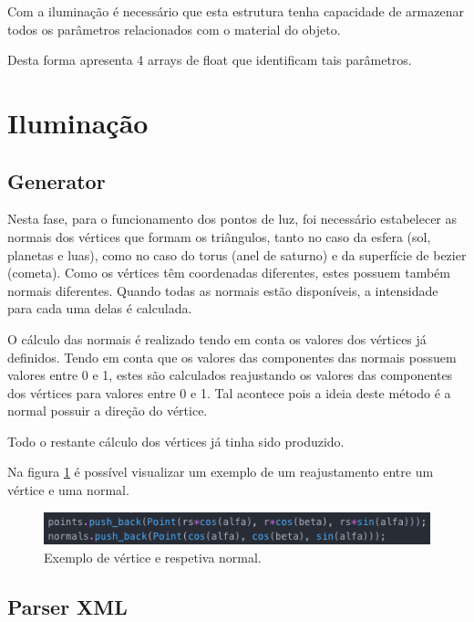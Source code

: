 \documentclass[a4paper]{article}
\begin{document}
Com a iluminação é necessário que esta estrutura tenha capacidade de armazenar todos os parâmetros relacionados com o material do objeto.

Desta forma apresenta 4 arrays de float que identificam tais parâmetros.


\newpage
\section{Iluminação}
\label{sec:iluminacao}

\subsection{Generator}
\label{sec:generatori}

Nesta fase, para o funcionamento dos pontos de luz, foi necessário estabelecer as normais dos vértices que formam os triângulos, tanto no caso da esfera (sol, planetas e luas), como no caso do torus (anel de saturno) e da superfície de bezier (cometa). Como os vértices têm coordenadas diferentes, estes possuem também normais diferentes. Quando todas as normais estão disponíveis, a intensidade para cada uma delas é calculada.

O cálculo das normais é realizado tendo em conta os valores dos vértices já definidos. Tendo em conta que os valores das componentes das normais possuem valores entre 0 e 1, estes são calculados reajustando os valores das componentes dos vértices para valores entre 0 e 1. Tal acontece pois a ideia deste método é a normal possuir a direção do vértice.

Todo o restante cálculo dos vértices já tinha sido produzido.

Na figura \ref{img:vertice_normal} é possível visualizar um exemplo de um reajustamento entre um vértice e uma normal.

\begin{figure}[H]
\centering
\includegraphics[scale=0.60]{vertice_normal.png}
\caption{Exemplo de vértice e respetiva normal.}
\label{img:vertice_normal}
\end{figure}

\subsection{Parser XML}
\label{sec:parseri}
\end{document}
